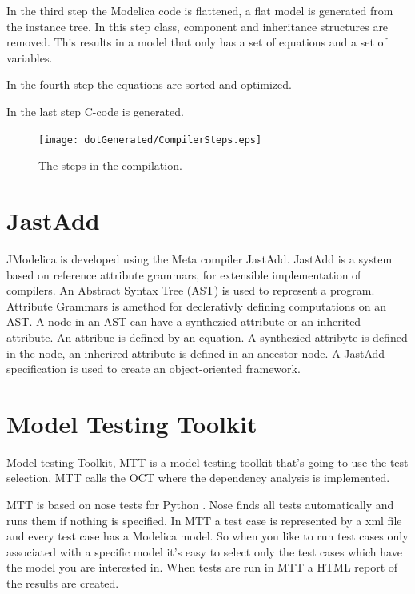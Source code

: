 \documentclass{cslthse-msc}
\begin{document}
In the third step the Modelica code is flattened, a flat model is generated from the instance tree. In this step class, component and inheritance structures are removed. This results in a model that only has a set of equations and a set of variables.

In the fourth step the equations are sorted and optimized.

In the last step C-code is generated.\cite{aakesson2010implementation}

\begin{figure}[!htbp]
    \centering
    {\texttt{[image: dotGenerated/CompilerSteps.eps]}}
    \caption{The steps in the compilation.}
    \label{fig:compilerSteps}
\end{figure}

\section{JastAdd}
JModelica is developed using the Meta compiler JastAdd. JastAdd is a system based on reference attribute grammars, for extensible implementation of compilers. An Abstract Syntax Tree (AST) is used to represent a program. Attribute Grammars is amethod for declerativly defining computations on an AST. A node in an AST can have a synthezied attribute or an inherited attribute. An attribue is defined by an equation. A synthezied attribyte is defined in the node, an inherired attribute is defined in an ancestor node. A JastAdd specification is used to create an object-oriented framework.~\cite{aakesson2008development}

\section{Model Testing Toolkit}
Model testing Toolkit, MTT is a model testing toolkit that's going to use the test selection, MTT calls the OCT where the dependency analysis is implemented.

MTT is based on nose tests for Python \cite{noseDoc}. Nose finds all tests automatically and runs them if nothing is specified. In MTT a test case is represented by a xml file and every test case has a Modelica model. So when you like to run test cases only associated with a specific model it's easy to select only the test cases which have the model you are interested in. When tests are run in MTT a HTML report of the results are created.
\end{document}
